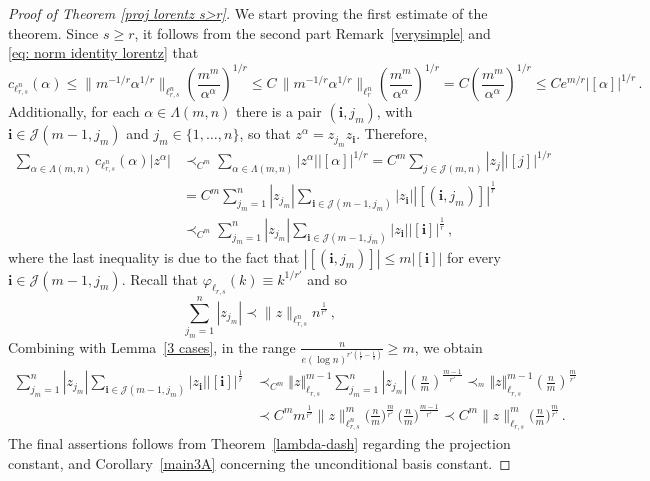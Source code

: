 \documentclass[12pt]{amsart}
\numberwithin{subsection}{section}
\theoremstyle{definition}
\theoremstyle{remark}
\newcommand{\Jj}{\mathcal J}
\newcommand{\ii}{\mathbf{i}}
\begin{document}
\smallskip

\begin{proof} [Proof of Theorem \ref{proj lorentz s>r}]
We start proving the first estimate of the theorem. Since $s\geq r$, it follows from the second part Remark~\ref{verysimple} and \eqref{eq: norm identity lorentz} that
\[
c_{\ell_{r,s}^n}(\alpha) \leq \|m^{-1/r}\alpha^{1/r}\|_{\ell_{r,s}^n} \left( \frac{m^{m}}{\alpha^\alpha} \right)^{1/r}
\leq C\,\|m^{-1/r}\alpha^{1/r}\|_{\ell_{r}^n} \left( \frac{m^{m}}{\alpha^\alpha} \right)^{1/r} =
C \left( \frac{m^{m}}{\alpha^\alpha} \right)^{1/r} \leq C e^{m/r} |[\alpha]|^{1/r}\,.
\]
Additionally,  for each $\alpha \in \Lambda(m,n)$ there is a pair $(\ii,j_{m})$, with $\ii \in \Jj(m-1,j_{m})$
and $j_m\in\{1,\dots,n\}$, so that $z^\alpha = z_{j_m}z_\ii$. Therefore,
\begin{equation*}%
\begin{split}
\sum_{\alpha \in \Lambda(m,n)} c_{\ell_{r,s}^n}(\alpha)  |z^\alpha|
& \prec_{C^m} \sum_{\alpha \in \Lambda(m,n)}  |z^\alpha | |[\alpha]|^{1/r} =  C^{m} \sum_{j\in \mathcal{J}(m,n)} |z_j| |[j]|^{1/r}
\\
&
= C^{m} \sum_{j_{m}=1}^n |z_{j_{m}}| \sum_{\ii \in \Jj(m-1,j_{m})} |z_\ii| |[(\ii,j_{m})]|^{\frac{1}{r}}
\\
&  \prec_{C^m}  \sum_{j_{m}=1}^n |z_{j_{m}}|   \sum_{\ii \in \Jj(m-1,j_{m})} |z_\ii| |[\ii]|^\frac{1}{r}\,,
\end{split}
\end{equation*}
where the last inequality is due to the fact that $|[(\ii,j_{m})]| \le m |[\ii]|$ for every $ \ii \in \Jj(m-1, j_{m})$.
Recall that $\varphi_{\ell_{r, s}}(k) \equiv k^{1/r'}$ and so
\[
\sum_{j_m =1}^n |z_{j_m}| \prec \|z\|_{\ell_{r, s}^n} n^{\frac{1}{r'}}\,,
\]
Combining with Lemma~\ref{3 cases}, in the range $\frac{n}{e(\log n)^{r'(\frac1{r}-\frac1{s})}}\ge m$, we obtain
\begin{align*}
\sum_{j_{m}=1}^n |z_{j_{m}}|
\sum_{\ii \in \Jj(m-1,j_{m})} |z_\ii| |[\ii]|^\frac{1}{r}
&
\prec_{C^m} \Vert z \Vert_{\ell_{r,s}}^{m-1} \sum_{j_{m}=1}^n |z_{j_{m}}|  \left(\frac{n}{m}\right)^{\frac{m-1}{r'}}
\prec_{^m} \Vert z \Vert_{\ell_{r,s}}^{m-1} \left(\frac{n}{m}\right)^{\frac{m}{r'}}
\\
&
\prec C^{m} m^{\frac{1}{r'}} \|z\|_{\ell_{r,s}^{n}}^m \Big(\frac{n}{m}\Big)^{\frac{m}{r'}}\,\Big(\frac{n}{m}\Big)^{\frac{m-1}{r'}}
\prec C^m \|z\|_{\ell_{r, s}}^{m} \Big(\frac{n}{m}\Big)^{\frac{m}{r'}}\,.
\end{align*}
The final assertions follows from  Theorem~\ref{lambda-dash} regarding the projection constant, and
Corollary~\ref{main3A} concerning the unconditional basis constant.
\end{proof}
\end{document}

